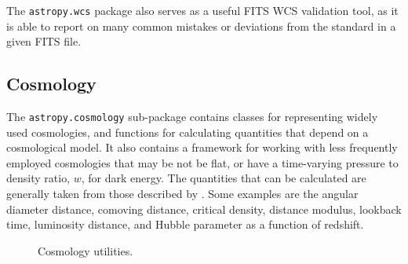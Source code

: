 \documentclass[traditabstract]{aa}
\begin{document}
The \texttt{astropy.wcs} package also serves as a useful FITS WCS validation
tool, as it is able to report on many common mistakes or deviations from the
standard in a given FITS file.

\subsection{Cosmology}

\label{sec:cosmology}


The \texttt{astropy.cosmology} sub-package contains classes for representing
widely used cosmologies, and functions for calculating quantities that depend
on a cosmological model. It also contains a framework for working with less
frequently employed cosmologies that may be not be flat, or have a
time-varying pressure to density ratio, $w$, for dark energy. The quantities
that can be calculated are generally taken from those described by
\citet{Hogg99}. Some examples are the angular diameter distance, comoving
distance, critical density, distance modulus, lookback time, luminosity
distance, and Hubble parameter as a function of redshift.

\begin{figure}
\center
\caption{Cosmology utilities.\label{code:cosmology}}
\vspace{0.1in}
\end{figure}
\end{document}
